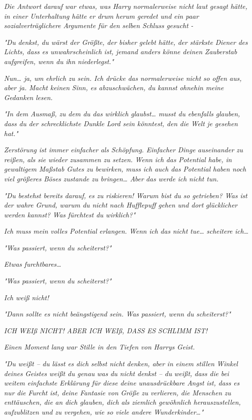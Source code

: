 {\emph{Die Antwort darauf war etwas, was Harry normalerweise nicht laut gesagt hätte, in einer Unterhaltung hätte er drum herum geredet und ein paar sozialverträglichere Argumente für den selben Schluss gesucht -}

\emph{\emph{"Du denkst, du wärst der Größte, der bisher gelebt hätte, der stärkste Diener des Lichts, dass es unwahrscheinlich ist, jemand anders könne deinen Zauberstab aufgreifen, wenn du ihn niederlegst."}}

\emph{Nun… ja, um ehrlich zu sein. Ich drücke das normalerweise nicht so offen aus, aber ja. Macht keinen Sinn, es abzuschwächen, du kannst ohnehin meine Gedanken lesen.}

\emph{"In dem Ausmaß, zu dem du das wirklich glaubst… musst du ebenfalls glauben, dass du der schrecklichste Dunkle Lord sein könntest, den die Welt je gesehen hat."}

\emph{Zerstörung ist immer einfacher als Schöpfung. Einfacher Dinge auseinander zu reißen, als sie wieder zusammen zu setzen. Wenn ich das Potential habe, in gewaltigem Maßstab Gutes zu bewirken, muss ich auch das Potential haben noch viel größeres Böses zustande zu bringen… Aber} \emph{das werde ich nicht tun.}

\emph{"Du bestehst bereits darauf, es zu riskieren! Warum bist du so getrieben? Was ist der wahre Grund, warum du nicht nach Hufflepuff gehen und dort} \emph{glücklicher} \emph{\emph{werden kannst? Was fürchtest du wirklich?}"}

\emph{Ich muss mein volles Potential erlangen. Wenn ich das nicht tue… scheitere ich…}

\emph{"Was passiert, wenn du scheiterst?"}

\emph{Etwas furchtbares…}

\emph{"Was passiert, wenn du scheiterst?"}

\emph{Ich weiß nicht!}

\emph{"Dann sollte es nicht beängstigend sein. Was passiert, wenn du scheiterst?"}

\emph{\emph{ICH WEIß NICHT! ABER ICH WEIß, DASS ES SCHLIMM IST!}}

\emph{Einen Moment lang war Stille in den Tiefen von Harrys Geist.}

\emph{\emph{"Du weißt -- du lässt es dich selbst nicht denken, aber in einem stillen Winkel deines Geistes weißt du genau}} \emph{was} \emph{\emph{du nicht denkst -- du}} \emph{weißt,} \emph{\emph{dass die bei weitem einfachste Erklärung für diese deine unausdrückbare Angst ist, dass es nur die Furcht ist, deine Fantasie von Größe zu verlieren, die Menschen zu enttäuschen, die an dich glauben, dich als ziemlich gewöhnlich herauszustellen, aufzublitzen und zu vergehen, wie so viele andere Wunderkinder…"}}

}
